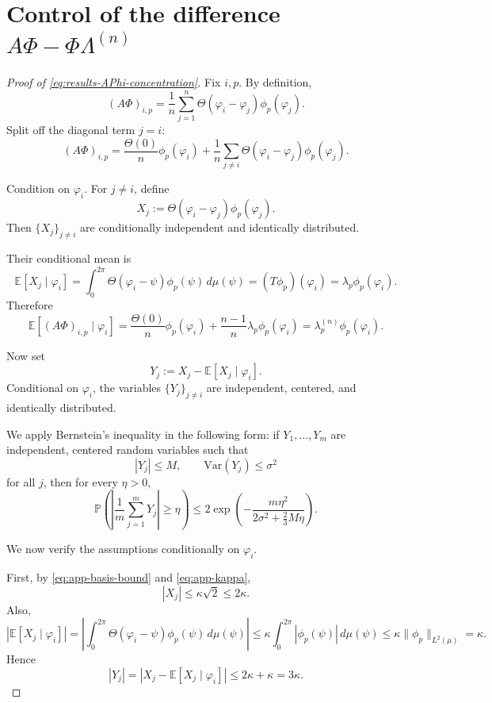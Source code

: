 \section{Control of the difference \(A\Phi-\Phi\Lambda^{(n)}\)}
\label{sec:app-APhi-proof}

\begin{proof}[Proof of \eqref{eq:results-APhi-concentration}]
	Fix \(i,p\). By definition,
	\[
		(A\Phi)_{i,p}
		=
		\frac{1}{n}\sum_{j=1}^n \Theta(\varphi_i-\varphi_j)\phi_p(\varphi_j).
	\]
	Split off the diagonal term \(j=i\):
	\[
		(A\Phi)_{i,p}
		=
		\frac{\Theta(0)}{n}\phi_p(\varphi_i)
		+
		\frac{1}{n}\sum_{j\neq i}\Theta(\varphi_i-\varphi_j)\phi_p(\varphi_j).
	\]

	Condition on \(\varphi_i\). For \(j\neq i\), define
	\[
		X_j:=\Theta(\varphi_i-\varphi_j)\phi_p(\varphi_j).
	\]
	Then \(\{X_j\}_{j\neq i}\) are conditionally independent and identically distributed.

	Their conditional mean is
	\[
		\mathbb E[X_j\mid \varphi_i]
		=
		\int_0^{2\pi}\Theta(\varphi_i-\psi)\phi_p(\psi)\,d\mu(\psi)
		=
		(T\phi_p)(\varphi_i)
		=
		\lambda_p\phi_p(\varphi_i).
	\]
	Therefore
	\[
		\mathbb E[(A\Phi)_{i,p}\mid \varphi_i]
		=
		\frac{\Theta(0)}{n}\phi_p(\varphi_i)
		+
		\frac{n-1}{n}\lambda_p\phi_p(\varphi_i)
		=
		\lambda_p^{(n)}\phi_p(\varphi_i).
	\]

	Now set
	\[
		Y_j:=X_j-\mathbb E[X_j\mid \varphi_i].
	\]
	Conditional on \(\varphi_i\), the variables \(\{Y_j\}_{j\neq i}\) are independent,
	centered, and identically distributed.

	We apply Bernstein's inequality \citep{Vershynin_2018a} in the following form: if \(Y_1,\dots,Y_m\) are independent,
	centered random variables such that
	\[
		|Y_j|\le M,
		\qquad
		\mathrm{Var}(Y_j)\le \sigma^2
	\]
	for all \(j\), then for every \(\eta>0\),
	\[
		\mathbb P\!\left(
		\left|
		\frac1m\sum_{j=1}^m Y_j
		\right|
		\ge \eta
		\right)
		\le
		2\exp\!\left(
		-\frac{m\eta^2}{2\sigma^2+\frac23 M\eta}
		\right).
	\]

	We now verify the assumptions conditionally on \(\varphi_i\).

	First, by \eqref{eq:app-basis-bound} and \eqref{eq:app-kappa},
	\[
		|X_j|
		\le
		\kappa \sqrt2
		\le
		2\kappa.
	\]
	Also,
	\[
		|\mathbb E[X_j\mid \varphi_i]|
		=
		\left|
		\int_0^{2\pi}\Theta(\varphi_i-\psi)\phi_p(\psi)\,d\mu(\psi)
		\right|
		\le
		\kappa \int_0^{2\pi}|\phi_p(\psi)|\,d\mu(\psi)
		\le
		\kappa \|\phi_p\|_{L^2(\mu)}
		=
		\kappa.
	\]
	Hence
	\[
		|Y_j|
		=
		|X_j-\mathbb E[X_j\mid \varphi_i]|
		\le
		2\kappa+\kappa
		=
		3\kappa.
	\]


\end{proof}

